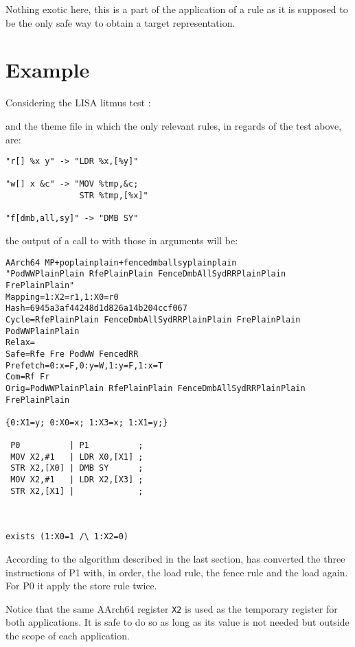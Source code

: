 Nothing exotic here, this is a part of the application of a rule as it is supposed
to be the only safe way to obtain a target representation.

\section{Example}

Considering the LISA litmus test
:



and the theme file  in which the
only relevant rules, in regards of the test above, are:

\begin{verbatim}
"r[] %x y" -> "LDR %x,[%y]"

"w[] x &c" -> "MOV %tmp,&c;
               STR %tmp,[%x]"

"f[dmb,all,sy]" -> "DMB SY"
\end{verbatim}

the output of a call to \jingle{} with those in arguments will be:
\begin{verbatim}
AArch64 MP+poplainplain+fencedmballsyplainplain
"PodWWPlainPlain RfePlainPlain FenceDmbAllSydRRPlainPlain FrePlainPlain"
Mapping=1:X2=r1,1:X0=r0
Hash=6945a3af44248d1d826a14b204ccf067
Cycle=RfePlainPlain FenceDmbAllSydRRPlainPlain FrePlainPlain PodWWPlainPlain
Relax=
Safe=Rfe Fre PodWW FencedRR
Prefetch=0:x=F,0:y=W,1:y=F,1:x=T
Com=Rf Fr
Orig=PodWWPlainPlain RfePlainPlain FenceDmbAllSydRRPlainPlain FrePlainPlain

{0:X1=y; 0:X0=x; 1:X3=x; 1:X1=y;}

 P0          | P1          ;
 MOV X2,#1   | LDR X0,[X1] ;
 STR X2,[X0] | DMB SY      ;
 MOV X2,#1   | LDR X2,[X3] ;
 STR X2,[X1] |             ;



exists (1:X0=1 /\ 1:X2=0)
\end{verbatim}

According to the algorithm described in the last section,
\jingle{} has converted the three instructions of P1 with,
in order, the load rule, the fence rule and the load again.
For P0 it apply the store rule twice.

Notice that the same AArch64 register \verb+X2+ is used as
the temporary register for both applications. It is safe to do so
as long as  its value is not needed but outside the scope
of each application.

